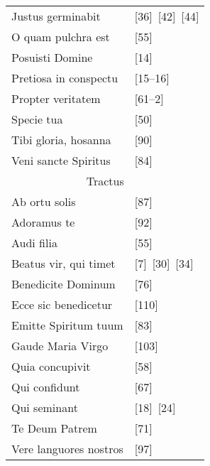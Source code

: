 \begin{landscape}
\begin{table}[ht]
\begin{tabular}{@{}ll@{}}
            Justus germinabit        & [36]~[42]~[44] \\
            O quam pulchra est       & [55]           \\
            Posuisti Domine          & [14]           \\
            Pretiosa in conspectu    & [15--16]       \\
            Propter veritatem        & [61--2]        \\
            Specie tua               & [50]           \\
            Tibi gloria, hosanna     & [90]           \\
            Veni sancte Spiritus     & [84]           \\ \midrule
            \multicolumn{2}{c}{Tractus}               \\
            Ab ortu solis            & [87]           \\
            Adoramus te              & [92]           \\
            Audi filia               & [55]           \\
            Beatus vir, qui timet    & [7]~[30]~[34]  \\
            Benedicite Dominum       & [76]           \\
            Ecce sic benedicetur     & [110]          \\
            Emitte Spiritum tuum     & [83]           \\
            Gaude Maria Virgo        & [103]          \\
            Quia concupivit          & [58]           \\
            Qui confidunt            & [67]           \\
            Qui seminant             & [18]~[24]      \\
            Te Deum Patrem           & [71]           \\
            Vere languores nostros   & [97]           \\ \bottomrule
            \end{tabular}
        \end{table}

  \end{landscape}
\restoregeometry


\vspace*{\fill}

